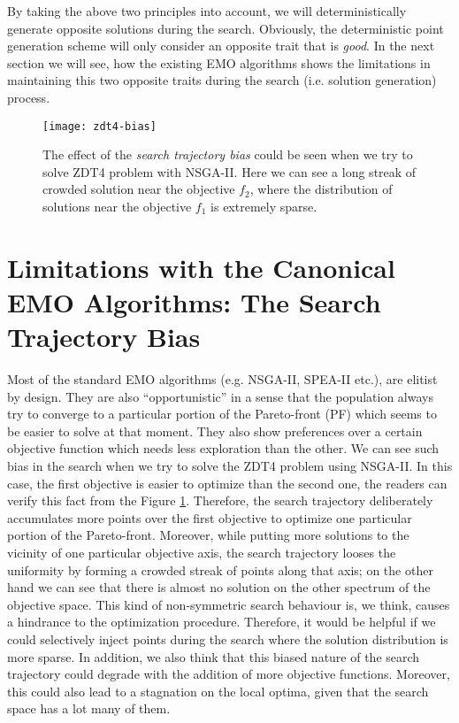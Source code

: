 \documentclass[journal]{IEEEtran}
\let\MYoriglatexcaption\caption
\renewcommand{\caption}[2][\relax]{\MYoriglatexcaption[#2]{#2}}
\begin{document}
By taking the above two principles into account, we will deterministically generate opposite solutions during the search. Obviously, the deterministic point generation scheme will only consider an opposite trait that is \textit{good}. In the next section we will see, how the existing EMO algorithms shows the limitations in maintaining this two opposite traits during the search (i.e. solution generation) process.  

\begin{figure}[!pb]
	\centering
	\texttt{[image: zdt4-bias]}
	\caption{The effect of the \textit{search trajectory bias} could be seen when we try to solve ZDT4 problem with NSGA-II. Here we can see a long streak of crowded solution near the objective \(f_2\), where the distribution of solutions near the objective \(f_1\) is extremely sparse.}
	\label{fig:zdt4-unbalanced-snapshot}
\end{figure}
%
\section{Limitations with the Canonical EMO Algorithms: The Search Trajectory Bias}
\label{sec:limitation-canonical}
Most of the standard EMO algorithms (e.g. NSGA-II, SPEA-II \cite{spea2-main} etc.), are elitist by design. They are also ``opportunistic'' in a sense that the population always try to converge to a particular portion of the Pareto-front (PF) which seems to be easier to solve at that moment. They also show preferences over a certain objective function which needs less exploration than the other. We can see such bias in the search when we try to solve the ZDT4 problem using NSGA-II. In this case, the first objective is easier to optimize than the second one, the readers can verify this fact from the Figure \ref{fig:zdt4-unbalanced-snapshot}. Therefore, the search trajectory deliberately accumulates more points over the first objective to optimize one particular portion of the Pareto-front. Moreover, while putting more solutions to the vicinity of one particular objective axis, the search trajectory looses the uniformity by forming a crowded streak of points along that axis; on the other hand we can see that there is almost no solution on the other spectrum of the objective space. This kind of non-symmetric search behaviour is, we think, causes a hindrance to the optimization procedure. Therefore, it would be helpful if we could selectively inject points during the search where the solution distribution is more sparse. In addition, we also think that this biased nature of the search trajectory could degrade with the addition of more objective functions. Moreover, this could also lead to a stagnation on the local optima, given that the search space has a lot many of them.
\end{document}
